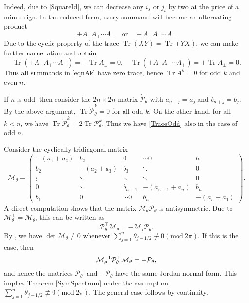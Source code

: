 \documentclass[12pt]{article}
\makeatletter
\renewenvironment{proof}[1][\proofname] 
{\par\pushQED{\qed}\normalfont\topsep6\p@\@plus6\p@\relax\trivlist\item[\hskip\labelsep\bfseries#1\@addpunct{.}]\ignorespaces}{\popQED\endtrivlist\@endpefalse}
\newcommand{\Pev}{\mathcal{P}}
\newcommand{\Mev}{\mathcal{M}}
\newcommand{\tr}{\operatorname{Tr}}
\newcommand{\Ao}{A_-}
\newcommand{\Ae}{A_+}
\makeatother
\begin{document}
\begin{proof}[First Proof (partial)]
Indeed, due to \eqref{SquareId}, we can decrease any $i_s$ or $j_t$ by two at the price of a minus sign. In the reduced form, every summand will become an alternating product
\[ \pm \Ao \Ae \cdots \Ao \quad \text{or} \quad \pm \Ae \Ao \cdots \Ae \] 
Due to the cyclic property of the trace $\tr(XY) = \tr(YX)$, we can make further cancellation and obtain
\[ \tr(\pm \Ao \Ae \cdots \Ao) = \pm \tr A_\pm = 0, \quad \tr(\pm \Ae \Ao \cdots \Ae) = \pm \tr A_\pm = 0.
\]
Thus all summands in \eqref{eqnAk} have zero trace, hence $\tr A^k = 0$ for odd $k$ and even $n$.
	
If $n$ is odd, then consider the $2n \times 2n$ matrix $\widetilde{\Pev}_\theta$ with $a_{n+j} = a_j$ and $b_{n+j} = b_j$. By the above argument, $\tr\widetilde{\Pev}_\theta^k = 0$ for all odd $k$. On the other hand, for all $k < n$, we have $\tr \widetilde{\Pev}_\theta^k = 2 \tr \Pev_\theta^k$. Thus we have \eqref{TraceOdd} also in the case of  odd $n$.
\end{proof}
\begin{proof}[Second Proof (complete).]
Consider the cyclically tridiagonal matrix
\[
\Mev_\theta = 
\begin{pmatrix} 
-(a_1+a_2)& b_2  & 0&\cdots 0&b_1\\ b_2& -(a_2+a_3) & b_3&\ddots & 0\\ \vdots&\ddots&\ddots &\ddots& 0\\ 0 &  \ddots     &   b_{n-1} &-(a_{n-1}+a_n)& b_n\\ b_1&0&\cdots  0&b_n& -(a_n+a_1)
\end{pmatrix}.
\]
A direct computation shows that the matrix $\mathcal{M}_\theta\Pev_\theta$ is antisymmetric. Due to $\mathcal{M}_\theta^\top = \mathcal{M}_\theta$, this can be written as
\begin{equation}
\label{eqn:AM}
\Pev_\theta^\top \mathcal{M}_\theta= -\mathcal{M}_\theta \Pev_\theta.
\end{equation}
By \cite[Theorem 3]{Izm}, we have $\det \mathcal{M}_\theta \ne 0$ whenever $\sum_{j=1}^n \theta_{j-1/2} \not\equiv 0(\mathrm{mod}\ 2\pi)$. If this is the case, then
\[ {\cal M}^{-1}_\theta \Pev_\theta^\top {\cal M}_\theta = -\Pev_\theta, \]
and hence the matrices $\Pev_\theta^\top$ and $-\Pev_\theta$ have the same Jordan normal form. This implies Theorem \ref{SymSpectrum} under the assumption $\sum_{j=1}^n \theta_{j-1/2} \not\equiv 0(\mathrm{mod}\ 2\pi)$. The general case follows by continuity.
\end{proof}
\end{document}
